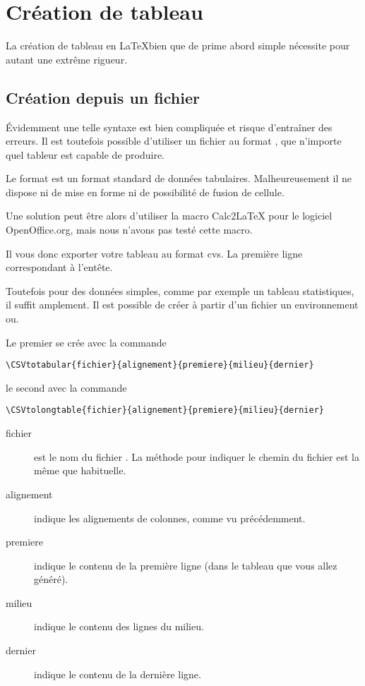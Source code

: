 \section{Création de tableau}

La création de tableau en \LaTeX bien que de prime abord simple nécessite pour autant une extrême rigueur.

\subsection{Création depuis un fichier }

Évidemment une telle syntaxe est bien compliquée et risque d'entraîner des erreurs. Il est toutefois possible d'utiliser un fichier au format , que n'importe quel tableur est capable de produire.

Le format  est un format standard de données tabulaires. Malheureusement il ne dispose ni de mise en forme ni de possibilité de fusion de cellule.

\begin{anedocte}Une solution peut être alors d'utiliser la macro Calc2LaTeX pour le logiciel OpenOffice.org, mais nous n'avons pas testé cette macro.
\end{anedocte}

Il vous donc exporter votre tableau au format cvs. La première ligne correspondant à l'entête.

Toutefois pour des données simples, comme par exemple un tableau statistiques, il suffit amplement. Il est possible de créer à partir d'un fichier  un environnement  ou.

Le premier se crée  avec la commande

\begin{verbatim}
\CSVtotabular{fichier}{alignement}{premiere}{milieu}{dernier}
\end{verbatim}

le second avec la commande

\begin{verbatim}
\CSVtolongtable{fichier}{alignement}{premiere}{milieu}{dernier}
\end{verbatim}

\begin{description}
\item[fichier]est le nom du fichier . La méthode pour indiquer le chemin du fichier est la même que habituelle.
\item[alignement] indique les alignements de colonnes, comme vu précédemment.
\item[premiere] indique le contenu de la première ligne (dans le tableau que vous allez généré).
\item[milieu] indique le contenu des lignes du milieu.
\item[dernier] indique le contenu de la dernière ligne.
\end{description}

